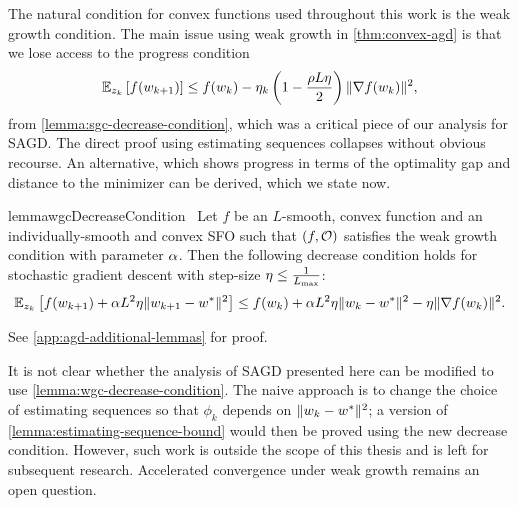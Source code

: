 The natural condition for convex functions used throughout this work is the weak growth condition.
The main issue using weak growth in \autoref{thm:convex-agd} is that we lose access to the progress condition 
\[ \Ek \sbr{f(\wkk)} \leq f(\wk) - \etak \rbr{1 - \frac{\sgc L \eta}{2}} \norm{\grad(\wk)}^2, \]
from \autoref{lemma:sgc-decrease-condition}, which was a critical piece of our analysis for \ac{SAGD}. 
The direct proof using estimating sequences collapses without obvious recourse.
An alternative, which shows progress in terms of the optimality gap and distance to the minimizer can be derived, which we state now.

 \begin{restatable}{lemma}{wgcDecreaseCondition}~\label{lemma:wgc-decrease-condition}
     Let \( f \) be an \( L \)-smooth, convex function and \oracle{} an individually-smooth and convex \ac{SFO} such that \( \rbr{f, \oracle{}} \) satisfies the weak growth condition with parameter \( \wgc \). 
    Then the following decrease condition holds for stochastic gradient descent with step-size \( \eta \leq \frac{1}{\Lmax} \):
    \[ \E_{\zk} \sbr{f(\wkk) + \wgc L^2 \eta \norm{\wkk - \wopt}^2} \leq f(\wk) + \wgc L^2 \eta \norm{\wk - \wopt}^2 - \eta \norm{\grad(\wk)}^2. \]
\end{restatable}
\noindent See \autoref{app:agd-additional-lemmas} for proof. \hfill \break

It is not clear whether the analysis of \ac{SAGD} presented here can be modified to use \autoref{lemma:wgc-decrease-condition}. 
The naive approach is to change the choice of estimating sequences so that \( \phi_k \)  depends on \( \norm{\wk - \wopt}^2 \); a version of \autoref{lemma:estimating-sequence-bound} would then be proved using the new decrease condition.
However, such work is outside the scope of this thesis and is left for subsequent research.
Accelerated convergence under weak growth remains an open question.


